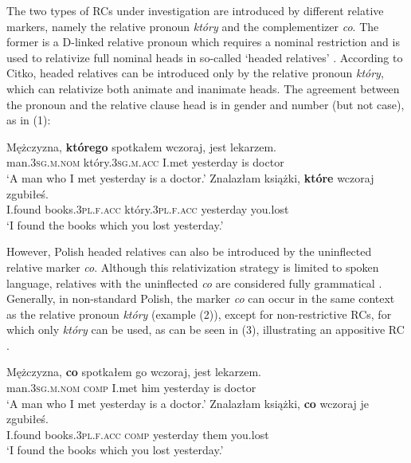 \documentclass[output=paper]{langsci/langscibook}
\begin{document}
The two types of RCs under investigation are introduced by different relative markers, namely the relative pronoun \textit{który} and the complementizer \textit{co}. The former is a D-linked relative pronoun which requires a nominal restriction and is used to relativize full nominal heads in so-called ‘headed relatives’ \citep{Citko2004}. According to Citko, headed relatives can be introduced only by the relative pronoun \textit{który}, which can relativize both animate and inanimate heads. The agreement between the pronoun and the relative clause head is in gender and number (but not case), as in (1): 

\ea%
    \label{ex:leska:1}
    \ea
    \gll Mężczyzna, \textbf{którego} spotkałem wczoraj, jest lekarzem.\\
         man.\textsc{3sg.m.nom} który.\textsc{3sg.m.acc} I.met yesterday is doctor\\
    \glt ‘A man who I met yesterday is a doctor.’
\ex
    \gll Znalazłam   książki, \textbf{które}   wczoraj zgubiłeś. \\
         I.found books.\textsc{3pl.f.acc} który.\textsc{3pl.f.acc} yesterday you.lost\\
    \glt ‘I found the books which you lost yesterday.’
    \z
\z    

However, Polish headed relatives can also be introduced by the uninflected relative marker \textit{co}. Although this relativization strategy is limited to spoken language, relatives with the uninflected \textit{co} are considered fully grammatical \citep{Buttler1971}. Generally, in non-standard Polish, the marker \textit{co} can occur in the same context as the relative pronoun \textit{który} (example (2)), except for non-restrictive RCs, for which only \textit{który} can be used, as can be seen in (3), illustrating an appositive RC \citep{Borsley1981,1984}.

\ea%
    \label{ex:leska:2}
    \ea
    \gll Mężczyzna, \textbf{co} spotkałem go wczoraj, jest lekarzem.\\
         man.\textsc{3sg.m.nom comp} I.met him yesterday is doctor\\
    \glt ‘A man who I met yesterday is a doctor.’
    \ex
    \gll Znalazłam   książki, \textbf{co} wczoraj   je zgubiłeś. \\
         I.found books.\textsc{3pl.f.acc comp}\textsubscript{} yesterday them you.lost\\
    \glt ‘I found the books which you lost yesterday.’
    \z
\z    
\end{document}
